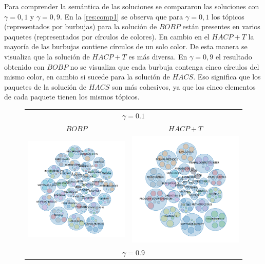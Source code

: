 Para comprender la semántica de las soluciones se compararon las soluciones con $\gamma = 0,1$ y $\gamma = 0,9$. En la \autoref{res:comp1} se observa que para $\gamma = 0,1$ los tópicos (representados por burbujas) para la solución de $BOBP$ están presentes en varios paquetes (representados por círculos de colores). En cambio en el $HACP+T$ la mayoría de las burbujas contiene círculos de un solo color. De esta manera se visualiza que la solución de $HACP+T$ es más diversa. En $\gamma = 0,9$ el resultado obtenido con $BOBP$ no se visualiza que cada burbuja contenga cinco círculos del mismo color, en cambio si sucede para la solución de $HACS$. Eso significa que los paquetes de la solución de $HACS$ son más cohesivos, ya que los cinco elementos de cada paquete tienen los mismos tópicos.

\begin{figure}[H]
	\centering
	\begin{tabular}{cc}
		\multicolumn{2}{c}{$\gamma=0.1$}\vspace{0.5cm}\\
		$BOBP$ & $HACP+T$\\
		\includegraphics[width=0.45\linewidth]{img/gamma-01-burbujas-alg-3.png}&
		\includegraphics[width=0.45\linewidth]{img/gamma-01-burbujas-alg-6.png}\vspace{1cm}\\
		\multicolumn{2}{c}{$\gamma=0.9$}\vspace{0.5cm}\\

\end{tabular}
\end{figure}
